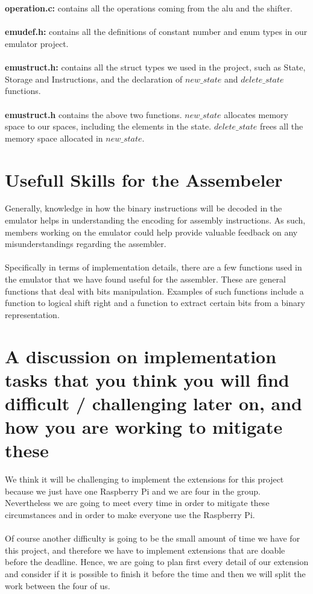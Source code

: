\documentclass[a4paper]{article}
\begin{document}
\\\\
\textbf{operation.c:} contains all the operations coming from the alu and the shifter.
\\\\
\textbf{emudef.h:} contains all the definitions of constant number and enum types in our emulator project.
\\\\
\textbf{emustruct.h:} contains all the struct types we used in the project, such as State, Storage and Instructions, and the declaration of $new\_state$ and $delete\_state$ functions.
\\\\
\textbf{emustruct.h} contains the above two functions. $new\_state$ allocates memory space to our spaces, including the elements in the state. $delete\_state$ frees all the memory space allocated in $new\_state$.

\section{Usefull Skills for the Assembeler}
Generally, knowledge in how the binary instructions will be decoded in the emulator helps in understanding the encoding for assembly instructions. As such, members working on the emulator could help provide valuable feedback on any misunderstandings regarding the assembler.
\\\\
Specifically in terms of implementation details, there are a few functions used in the emulator that we have found useful for the assembler. These are general functions that deal with bits manipulation. Examples of such functions include a function to logical shift right and a function to extract certain bits from a binary representation.

\section{A discussion on implementation tasks that you think you will find difficult / challenging later on,
and how you are working to mitigate these}
We think it will be challenging to implement the extensions for this project because we just have one Raspberry Pi and we are four in the group. Nevertheless we are going to meet every time in order to mitigate these circumstances and in order to make everyone use the Raspberry Pi.
\\\\
Of course another difficulty is going to be the small amount of time we have for this project, and therefore we have to implement extensions that are doable before the deadline. Hence, we are going to plan first every detail of our extension and consider if it is possible to finish it before the time and then we will split the work between the four of us.
\end{document}
